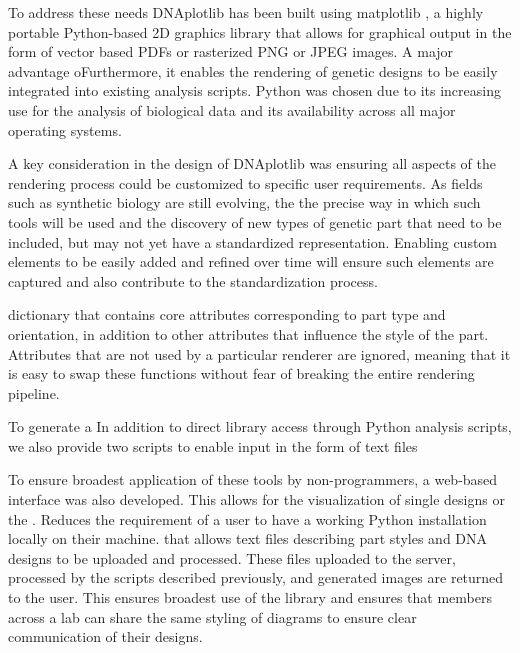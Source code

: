 \documentclass{bioinfo}
\begin{document}
To address these needs DNAplotlib has been built using matplotlib \citep{Hunter07a}, a highly portable Python-based 2D graphics library that allows for graphical output in the form of vector based PDFs or rasterized PNG or JPEG images. A major advantage oFurthermore, it enables the rendering of genetic designs to be easily integrated into existing analysis scripts. Python was chosen due to its increasing use for the analysis of biological data \citep{Cock09a} and its availability across all major operating systems.

A key consideration in the design of DNAplotlib was ensuring all aspects of the rendering process could be customized to specific user requirements. As fields such as synthetic biology are still evolving, the the precise way in which such tools will be used and the discovery of new types of genetic part that need to be included, but may not yet have a standardized representation. Enabling custom elements to be easily added and refined over time will ensure such elements are captured and also contribute to the standardization process. 

dictionary that contains core attributes corresponding to part type and orientation, in addition to other attributes that influence the style of the part. Attributes that are not used by a particular renderer are ignored, meaning that it is easy to swap these functions without fear of breaking the entire rendering pipeline.

To generate a 
In addition to direct library access through Python analysis scripts, we also provide two scripts to enable input in the form of text files

To ensure broadest application of these tools by non-programmers, a web-based interface was also developed. This allows for the visualization of single designs or the . Reduces the requirement of a user to have a working Python installation locally on their machine.
that allows text files describing part styles and DNA designs to be uploaded and processed. These files uploaded to the server, processed by the scripts described previously, and generated images are returned to the user. This ensures broadest use of the library and ensures that members across a lab can share the same styling of diagrams to ensure clear communication of their designs.
\end{document}
